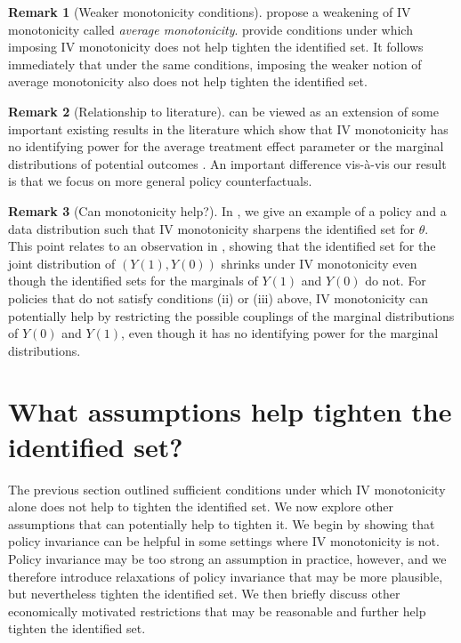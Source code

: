 \documentclass[12pt]{article}%
\theoremstyle{definition}
\newtheorem{remark}{Remark}
\newcommand\1{\operatorname{I}\indicatorfence}
\begin{document}
\begin{remark}[Weaker monotonicity conditions]
  \textcite{fll23} propose a weakening of IV monotonicity called \emph{average monotonicity}.
  provide conditions under which imposing IV monotonicity does not help tighten
  the identified set. It follows immediately that under the same conditions,
  imposing the weaker notion of average monotonicity also does not help tighten
  the identified set.
\end{remark}

\begin{remark}[Relationship to literature]
  can be viewed as an extension of some important existing results in the
  literature which show that IV monotonicity has no identifying power
  for the average treatment effect parameter or the marginal distributions of potential outcomes
  \parencite{BaPe97,kitagawa21,bai_identifying_2024, RiRo14}. An important difference
  vis-\`a-vis our result is that we focus on more general policy
  counterfactuals.
\end{remark}


\begin{remark}[Can monotonicity help?]
  In , we give an example of a policy and a data distribution such that IV
  monotonicity sharpens the identified set for $\theta$. This point relates to an observation in
  \textcite{kamat_identifying_2019}, showing that the identified set for the
  joint distribution of $(Y(1), Y(0))$ shrinks under IV monotonicity even though the identified sets for the marginals of $Y(1)$ and $Y(0)$ do not. For
  policies that do not satisfy conditions (ii) or (iii) above,
  IV monotonicity can potentially help by restricting the possible couplings of the
  marginal distributions of $Y(0)$ and $Y(1)$, even though it has no identifying
  power for the marginal distributions.
\end{remark}

\section{What assumptions help tighten the identified set?}\label{sec:other_restrictions_help}

The previous section outlined sufficient conditions under which IV monotonicity alone does not help to tighten the identified set. We now explore other assumptions that can potentially help to tighten it. We begin by showing that policy invariance can be helpful in some settings where IV monotonicity is not. Policy invariance may be too strong an assumption in practice, however, and we therefore introduce relaxations of policy invariance that may be more plausible, but nevertheless tighten the identified set. We then briefly discuss other economically motivated restrictions that may be reasonable and further help tighten the identified set.
\end{document}
